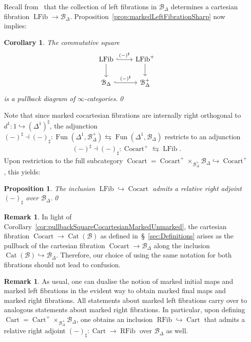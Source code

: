 \documentclass[reqno]{amsart}
\numberwithin{equation}{subsection}
\theoremstyle{plain}
\newtheorem{proposition}[equation]{Proposition}
\newtheorem{corollary}[equation]{Corollary}
\theoremstyle{definition}
\newtheorem{remark}[equation]{Remark}
\let\scr=\mathcal
\let\into=\hookrightarrow
\def\BB{\scr B}
\DeclareMathOperator{\Cat}{Cat}
\DeclareMathOperator{\Cart}{Cart}
\DeclareMathOperator{\Cocart}{Cocart}
\DeclareMathOperator{\RFib}{RFib}
\DeclareMathOperator{\LFib}{LFib}
\DeclareMathOperator{\Fun}{Fun}
\newcommand{\Simp}[1]{#1_{\Delta}}
\newcommand{\mSimp}[1]{#1_{\Delta}^+}
\begin{document}
Recall from~\cite[\S~4.1]{Martini2021} that the collection of left fibrations in $\Simp\BB$ determines a cartesian fibration $\LFib\to\Simp\BB$. Proposition~\ref{prop:markedLeftFibrationSharp} now implies:
\begin{corollary}
	\label{cor:pullbackSquareLFibMarkedUnmarked}
	The commutative square
	\begin{equation*}
	\begin{tikzcd}
	\LFib\arrow[r, hookrightarrow, "(-)^\sharp"]\arrow[d] & \LFib^+\arrow[d]\\
	\Simp\BB\arrow[r, hookrightarrow, "(-)^\sharp"] & \mSimp\BB
	\end{tikzcd}
	\end{equation*}
	is a pullback diagram of $\infty$-categories.\qed
\end{corollary}
Note that since marked cocartesian fibrations are internally right orthogonal to $d^1\colon 1\into (\Delta^1)^\sharp$, the adjunction $(-)^\sharp\dashv (-)_\sharp\colon\Fun(\Delta^1,\mSimp\BB)\leftrightarrows\Fun(\Delta^1,\Simp\BB)$ restricts to an adjunction
\begin{equation*}
(-)^\sharp\dashv (-)_\sharp\colon \Cocart^+\leftrightarrows\LFib.
\end{equation*}
Upon restriction to the full subcategory $\Cocart=\Cocart^+\times_{\mSimp\BB}\Simp\BB\into\Cocart^+$, this yields:
\begin{proposition}
	\label{prop:coreflectionLeftFibrationsCocartesianFibrations}
	The inclusion $\LFib\into\Cocart$ admits a relative right adjoint $(-)_\sharp$ over $\Simp\BB$.\qed
\end{proposition}
\begin{remark}
	In light of Corollary~\ref{cor:pullbackSquareCocartesianMarkedUnmarked}, the cartesian fibration $\Cocart\to\Cat(\BB)$ as defined in~\S~\ref{sec:Definitions} arises as the pullback of the cartesian fibration $\Cocart\to\Simp\BB$ along the inclusion $\Cat(\BB)\into\Simp\BB$. Therefore, our choice of using the same notation for both fibrations should not lead to confusion.
\end{remark}

\begin{remark}
	\label{rem:markedRightFibrations}
	As usual, one can dualise the notion of marked initial maps and marked left fibrations in the evident way to obtain marked final maps and marked right fibrations. All statements about marked left fibrations carry over to analogous statements about marked right fibrations. In particular, upon defining $\Cart=\Cart^+\times_{\mSimp\BB}\Simp\BB$, one obtains an inclusion $\RFib\into\Cart$ that admits a relative right adjoint $(-)_\sharp\colon \Cart\to \RFib$ over $\Simp\BB$ as well.
\end{remark}
\end{document}
